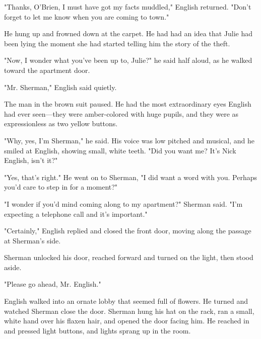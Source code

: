 \documentclass{novel}
\begin{document}
"Thanks, O'Brien, I must have got my facts muddled," English returned. "Don't forget to let me know when you are coming to town."

He hung up and frowned down at the carpet. He had had an idea that Julie had been lying the moment she had started telling him the story of the theft.

"Now, I wonder what you've been up to, Julie?" he said half aloud, as he walked toward the apartment door.

\vspace{2\nbs}
\clearpage
\thispagestyle{empty}

\begin{ChapterStart}
\vspace{3\nbs}
\end{ChapterStart}
    
"Mr. Sherman," English said quietly.

The man in the brown suit paused. He had the most extraordinary eyes English had ever seen—they were amber-colored with huge pupils, and they were as expressionless as two yellow buttons.

"Why, yes, I'm Sherman," he said. His voice was low pitched and musical, and he smiled at English, showing small, white teeth. "Did you want me? It's Nick English, isn't it?"

"Yes, that's right." He went on to Sherman, "I did want a word with you. Perhaps you'd care to step in for a moment?"

"I wonder if you'd mind coming along to my apartment?" Sherman said. "I'm expecting a telephone call and it's important."

"Certainly," English replied and closed the front door, moving along the passage at Sherman's side.

Sherman unlocked his door, reached forward and turned on the light, then stood aside.

"Please go ahead, Mr. English."

English walked into an ornate lobby that seemed full of flowers. He turned and watched Sherman close the door. Sherman hung his hat on the rack, ran a small, white hand over his flaxen hair, and opened the door facing him. He reached in and pressed light buttons, and lights sprang up in the room.
\end{document}
